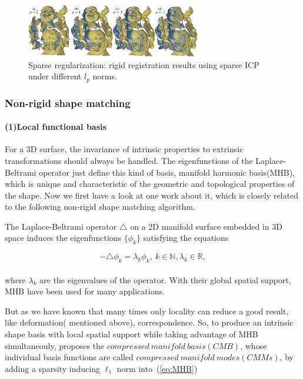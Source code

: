 \begin{figure}[ht]
  \centering
  \includegraphics[width=3in]{images/sparseICP}
  \caption{Sparse regularization: rigid registration results using sparse ICP\cite{chartrand2007exact} under different $l_{p}$ norms.}
  \label{fig:sparseICP}
\end{figure}



\subsubsection{Non-rigid shape matching}
\label{subsubsec:non-rigid shape matching}

\paragraph{(1)Local functional basis}
For a 3D surface, the invariance of intrinsic properties to extrinsic transformations should always be handled.
The eigenfunctions of the Laplace-Beltrami operator just define this kind of basis, manifold harmonic basis(MHB), 
which is unique and characteristic of the geometric and topological properties of the shape.
Now we first have a look at one work about it, which is closely related to the following non-rigid shape matching algorithm.


The Laplace-Beltrami operator $\triangle$ on a 2D manifold surface embedded in 3D space induces the eigenfunctions $\{\phi_{k}\}$ satisfying the equations

\small{
\begin{equation}
 \label{eq:MHB}
 -\triangle\phi_{k}=\lambda_{k}\phi_{k},~k\in\mathbb{N},\lambda_{k}\in\mathbb{R},
\end{equation}
}
\\
where $\lambda_{k}$ are the eigenvalues of the operator.
With their global spatial support, MHB have been used for many applications.

But as we have known that many times only locality can reduce a good result, like deformation(\cite{zhang2014local} mentioned above), correspondence.
So, to produce an intrinsic shape basis with local spatial support while taking advantage of MHB simultaneouly, \cite{neumann2014compressed} proposes the $compressed~manifold~basis(CMB)$, whose individual basis functions are called $compressed~manifold~modes(CMMs)$, by adding a sparsity inducing $\ell_1$ norm into~(\ref{eq:MHB})


